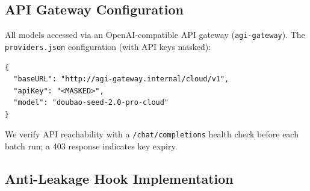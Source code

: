 \subsection{API Gateway Configuration}
\label{sec:api-config}

All models accessed via an OpenAI-compatible API gateway (\texttt{agi-gateway}). The \texttt{providers.json} configuration (with API keys masked):
{\scriptsize\begin{verbatim}
{
  "baseURL": "http://agi-gateway.internal/cloud/v1",
  "apiKey": "<MASKED>",
  "model": "doubao-seed-2.0-pro-cloud"
}
\end{verbatim}}
{\sloppy We verify API reachability with a \texttt{/chat/completions} health check before each batch run; a 403 response indicates key expiry.\par}

\subsection{Anti-Leakage Hook Implementation}
\label{sec:hook-impl}

